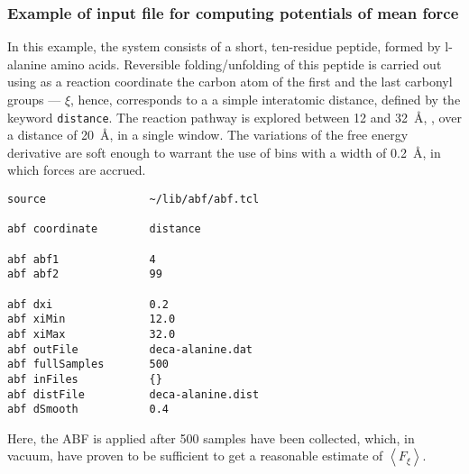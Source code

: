\subsubsection{Example of input file for computing potentials of mean force}


In this example,
the system consists of a short,
ten-residue peptide, formed by {\sc l}-alanine amino acids.
Reversible folding/unfolding of
this peptide is carried out using as a reaction coordinate the carbon
atom of the first and the last carbonyl groups --- $\xi$, hence,
corresponds to a a simple interatomic distance, defined by the
keyword {\tt distance}. The reaction pathway is explored between
12 and 32~\AA, \ie, over a distance of 20~\AA, in a single window.
The variations of the free energy derivative are soft enough to warrant
the use of bins with a width of 0.2~\AA, in which forces are accrued.


\begin{verbatim}
source                ~/lib/abf/abf.tcl

abf coordinate        distance

abf abf1              4
abf abf2              99

abf dxi               0.2
abf xiMin             12.0
abf xiMax             32.0
abf outFile           deca-alanine.dat
abf fullSamples       500
abf inFiles           {}
abf distFile          deca-alanine.dist
abf dSmooth           0.4
\end{verbatim}


Here, the ABF is applied after 500 samples have been
collected, which, in vacuum, have proven to be sufficient
to get a reasonable estimate of $\left\langle F_\xi \right\rangle$.

